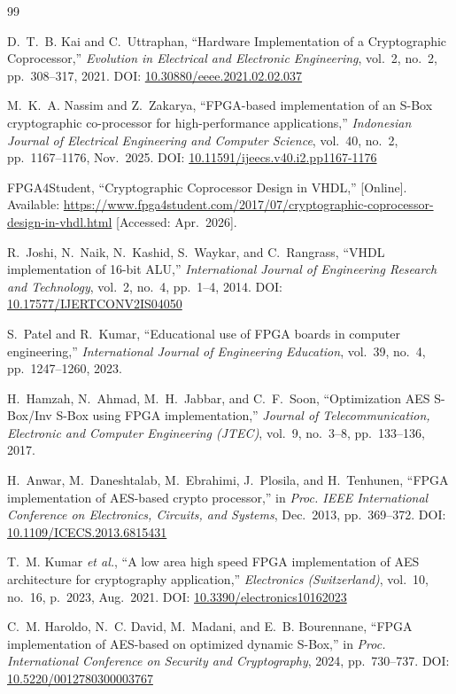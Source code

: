 \documentclass[12pt, a4paper]{report}
\begin{document}
\begin{thebibliography}{99}

D.~T.~B. Kai and C.~Uttraphan,
``Hardware Implementation of a Cryptographic Coprocessor,''
\textit{Evolution in Electrical and Electronic Engineering},
vol.~2, no.~2, pp.~308--317, 2021.
DOI: \href{https://doi.org/10.30880/eeee.2021.02.02.037}{10.30880/eeee.2021.02.02.037}

M.~K.~A. Nassim and Z.~Zakarya,
``FPGA-based implementation of an S-Box cryptographic co-processor for high-performance applications,''
\textit{Indonesian Journal of Electrical Engineering and Computer Science},
vol.~40, no.~2, pp.~1167--1176, Nov.~2025.
DOI: \href{https://doi.org/10.11591/ijeecs.v40.i2.pp1167-1176}{10.11591/ijeecs.v40.i2.pp1167-1176}

FPGA4Student,
``Cryptographic Coprocessor Design in VHDL,''
[Online]. Available:
\url{https://www.fpga4student.com/2017/07/cryptographic-coprocessor-design-in-vhdl.html}
[Accessed: Apr.~2026].


R.~Joshi, N.~Naik, N.~Kashid, S.~Waykar, and C.~Rangrass,
``VHDL implementation of 16-bit ALU,''
\textit{International Journal of Engineering Research and Technology},
vol.~2, no.~4, pp.~1--4, 2014.
DOI: \href{https://doi.org/10.17577/IJERTCONV2IS04050}{10.17577/IJERTCONV2IS04050}

S.~Patel and R.~Kumar,
``Educational use of FPGA boards in computer engineering,''
\textit{International Journal of Engineering Education},
vol.~39, no.~4, pp.~1247--1260, 2023.

H.~Hamzah, N.~Ahmad, M.~H.~Jabbar, and C.~F.~Soon,
``Optimization AES S-Box/Inv S-Box using FPGA implementation,''
\textit{Journal of Telecommunication, Electronic and Computer Engineering (JTEC)},
vol.~9, no.~3--8, pp.~133--136, 2017.

H.~Anwar, M.~Daneshtalab, M.~Ebrahimi, J.~Plosila, and H.~Tenhunen,
``FPGA implementation of AES-based crypto processor,''
in \textit{Proc. IEEE International Conference on Electronics, Circuits, and Systems},
Dec.~2013, pp.~369--372.
DOI: \href{https://doi.org/10.1109/ICECS.2013.6815431}{10.1109/ICECS.2013.6815431}

T.~M. Kumar \textit{et al.},
``A low area high speed FPGA implementation of AES architecture for cryptography application,''
\textit{Electronics (Switzerland)},
vol.~10, no.~16, p.~2023, Aug.~2021.
DOI: \href{https://doi.org/10.3390/electronics10162023}{10.3390/electronics10162023}



C.~M. Haroldo, N.~C. David, M.~Madani, and E.~B. Bourennane,
``FPGA implementation of AES-based on optimized dynamic S-Box,''
in \textit{Proc. International Conference on Security and Cryptography},
2024, pp.~730--737.
DOI: \href{https://doi.org/10.5220/0012780300003767}{10.5220/0012780300003767}


\end{thebibliography}
\end{document}
